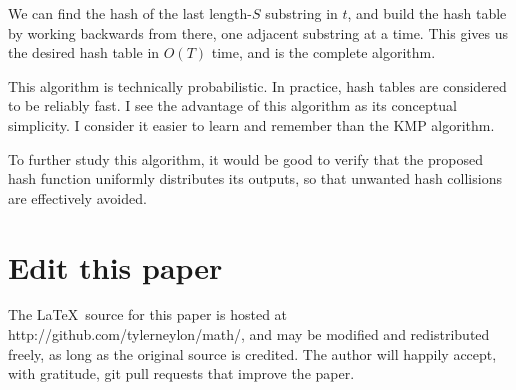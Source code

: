 \documentclass[11pt]{amsart}
\begin{document}
We can find the hash of the last length-$S$ substring in $t$, and
build the hash table by working backwards from there, one adjacent
substring at a time. This gives us the desired hash table in $O(T)$
time, and is the complete algorithm.

This algorithm is technically probabilistic. In practice, hash tables
are considered to be reliably fast. I see the advantage of this algorithm
as its conceptual simplicity. I consider it easier to learn and remember
than the KMP algorithm.

To further study this algorithm, it would be good to verify that the
proposed hash function uniformly distributes its outputs, so that
unwanted hash collisions are effectively avoided.

\section{Edit this paper}

The \LaTeX\ source for this paper is hosted at
{\sf http://github.com/tylerneylon/math/},
and may be modified and redistributed freely,
as long as the original source is credited.
The author will happily accept, with gratitude,
git pull requests that improve the paper.

%
\end{document}
